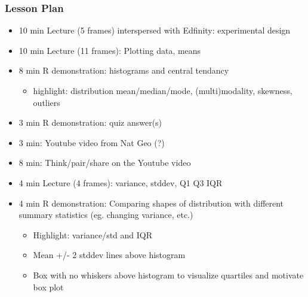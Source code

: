 \begin{frame}
    \frametitle{Lesson Plan}
    \begin{itemize}
        \item 10 min Lecture (5 frames) interspersed with Edfinity: experimental design
        \item 10 min Lecture (11 frames): Plotting data, means
        \item 8 min R demonstration: histograms and central tendancy
        \begin{itemize}
            \item  highlight: distribution mean/median/mode, (multi)modality, skewness, outliers
        \end{itemize}
        \item 3 min R demonstration: quiz answer(s)
        \item 3 min: Youtube video from Nat Geo (?)
        \item 8 min: Think/pair/share on the Youtube video
        \item 4 min Lecture (4 frames): variance, stddev, Q1 Q3 IQR
        \item 4 min R demonstration: Comparing shapes of distribution with different summary statistics (eg. changing variance, etc.)
        \begin{itemize}
            \item Highlight: variance/std and IQR
            \item Mean +/- 2 stddev lines above histogram
            \item Box with no whiskers above histogram to visualize quartiles and motivate box plot
         \end{itemize}
     \end{itemize}
\end{frame}


